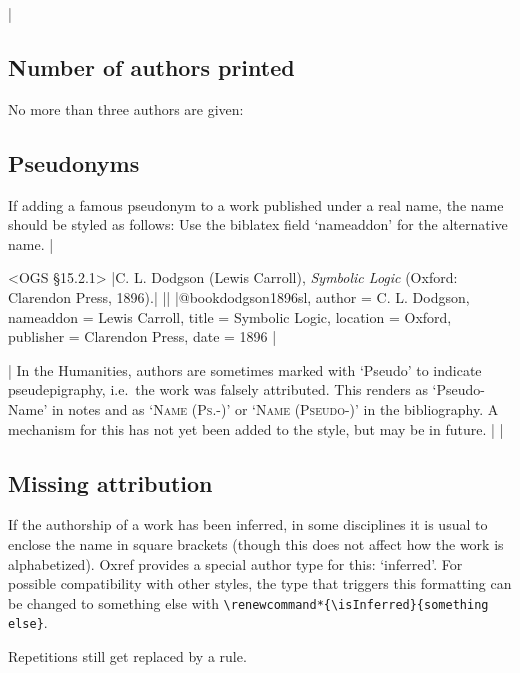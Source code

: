 \documentclass[extrafontsizes,11pt,a4paper,oneside]{memoir}
\newcommand*{\code}[1]{`\textsf{#1}'}
\def\isInferred{inferred}
\begin{document}
\todoc|
\subsection{Number of authors printed}

No more than three authors are given:\par
{}\par
{}\par
{}\par
{} %

\subsection{Pseudonyms}

If adding a famous pseudonym to a work published under a real name,
the name should be styled as follows:
Use the \textsf{biblatex} field \code{nameaddon} for the alternative name.
|

\bibexample<OGS \S15.2.1>
|C. L. Dodgson (Lewis Carroll), \emph{Symbolic Logic} (Oxford: Clarendon Press, 1896).|%
||%
|@book{dodgson1896sl,
  author = {C. L. Dodgson},
  nameaddon = {Lewis Carroll},
  title = {Symbolic Logic},
  location = {Oxford},
  publisher = {Clarendon Press},
  date = {1896}
}|

\todoc[oxnotes]|
In the Humanities, authors are sometimes marked with ‘Pseudo’ to indicate
pseudepigraphy, i.e.\ the work was falsely attributed. This renders as
‘Pseudo-Name’ in notes and as ‘\textsc{Name (Ps.-)}’ or ‘\textsc{Name (Pseudo-)}’
in the bibliography. A mechanism for this has not yet been added to the style,
but may be in future.
|
\todoc|
\subsection{Missing attribution}

If the authorship of a work has been inferred, in some disciplines it is usual
to enclose the name in square brackets (though this does not affect how the work
is alphabetized). Oxref provides a special author type for this: \code{inferred}.
For possible compatibility with other styles, the type that triggers this formatting
can be changed to something else with \lstinline!\renewcommand*{\isInferred}{something else}!.

Repetitions still get replaced by a rule.\\
\end{document}

